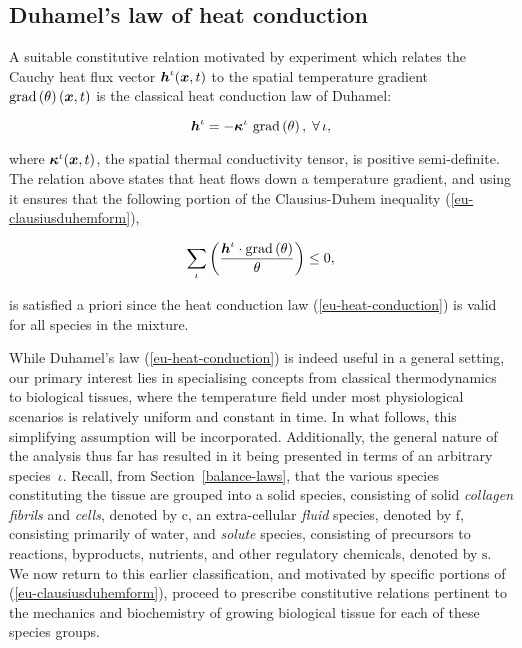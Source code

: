 \subsection{Duhamel's law of heat conduction}
\label{eu-duhamel-law}

A suitable constitutive relation motivated by experiment which relates
the Cauchy heat flux vector $\mbox{\boldmath$ h$}^{\iota}(\mbox{\boldmath$ x$},t)$ to the spatial
temperature gradient $\mathrm{grad}\left(\theta\right)(\mbox{\boldmath$ x$},t)$ is the
classical heat conduction law of Duhamel:

\begin{equation}
\mbox{\boldmath$ h$}^{\iota} =  -
\mbox{\boldmath$\kappa$}^{\iota}\ \mathrm{grad}\left(\theta\right),\;\forall\,\iota,
\label{eu-heat-conduction}
\end{equation}

\noindent where $\mbox{\boldmath$\kappa$}^{\iota}(\mbox{\boldmath$ x$},t)$, the spatial thermal
conductivity tensor, is positive semi-definite. The relation above
states that heat flows down a temperature gradient, and using it
ensures that the following portion of the Clausius-Duhem inequality
(\ref{eu-clausiusduhemform}),

\begin{equation*}
\sum\limits_{\iota}
\left(\frac{\mbox{\boldmath$ h$}^{\iota} \cdot 
  \mathrm{grad}\left(\theta\right)}{\theta} \right) \leq 0,
\end{equation*}

\noindent is satisfied a priori since the heat conduction law
(\ref{eu-heat-conduction}) is valid for all species in the mixture.

While Duhamel's law (\ref{eu-heat-conduction}) is indeed useful in a
general setting, our primary interest lies in specialising concepts
from classical thermodynamics to biological tissues, where the
temperature field under most physiological scenarios is relatively
uniform and constant in time. In what follows, this simplifying
assumption will be incorporated. Additionally, the general nature of
the analysis thus far has resulted in it being presented in terms of
an arbitrary species~$\iota$. Recall, from Section~\ref{balance-laws},
that the various species constituting the tissue are grouped into a
solid species, consisting of solid \emph{collagen fibrils} and
\emph{cells}, denoted by $\mathrm{c}$, an extra-cellular \emph{fluid}
species, denoted by $\mathrm{f}$, consisting primarily of water, and
\emph{solute} species, consisting of precursors to reactions,
byproducts, nutrients, and other regulatory chemicals, denoted by
$\mathrm{s}$. We now return to this earlier classification, and
motivated by specific portions of (\ref{eu-clausiusduhemform}),
proceed to prescribe constitutive relations pertinent to the mechanics
and biochemistry of growing biological tissue for each of these
species groups.

